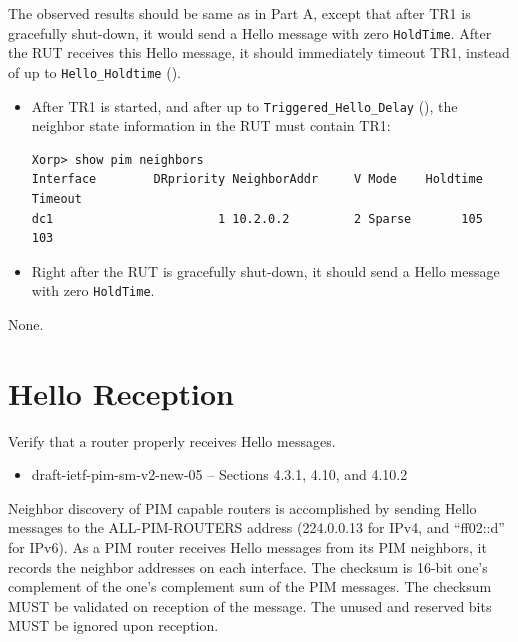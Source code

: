 \documentclass[11pt]{report}
\begin{document}

The observed results should be same as in Part A, except that after TR1 is
gracefully shut-down, it would send a Hello message with zero \verb=HoldTime=.
After the RUT receives this Hello message, it should immediately timeout TR1,
instead of up to  \verb=Hello_Holdtime= ({\PimsmHelloHoldtime}).


\begin{itemize}

  \item After TR1 is started, and after up to \verb=Triggered_Hello_Delay=
        ({\PimsmTriggeredHelloDelay}), the neighbor state information in the
        RUT must contain TR1:

\begin{verbatim}
Xorp> show pim neighbors 
Interface        DRpriority NeighborAddr     V Mode    Holdtime Timeout
dc1                       1 10.2.0.2         2 Sparse       105     103
\end{verbatim}

  \item Right after the RUT is gracefully shut-down, it should send
        a Hello message with zero \verb=HoldTime=.

\end{itemize}

None.

\newpage
\section{Hello Reception}

Verify that a router properly receives Hello messages.

\begin{itemize}
  \item draft-ietf-pim-sm-v2-new-05 -- Sections 4.3.1, 4.10, and 4.10.2
\end{itemize}

Neighbor discovery of PIM capable routers is accomplished by sending Hello
messages to the ALL-PIM-ROUTERS address (224.0.0.13 for IPv4,
and ``ff02::d'' for IPv6). As a PIM router receives Hello messages from its
PIM neighbors, it records the neighbor addresses on each interface.
The checksum is 16-bit one's complement of the one's complement sum of the PIM
messages. The checksum MUST be validated on reception of the message.
The unused and reserved bits MUST be ignored upon reception.
\end{document}
